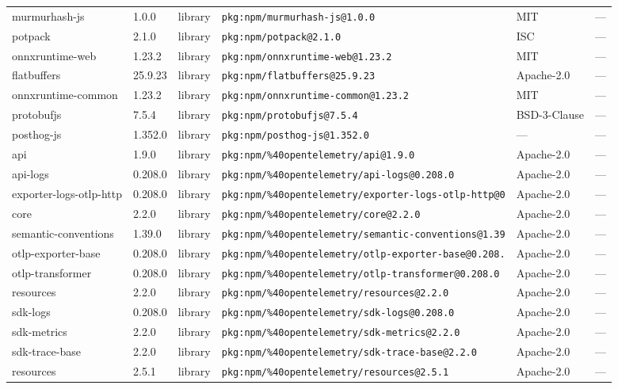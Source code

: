 \documentclass[11pt]{article}
\begin{document}
\begin{longtable}{|l|l|l|p{2.2cm}|l|p{4cm}|}
murmurhash-js & 1.0.0 & library & \texttt{pkg:npm/murmurhash-js@1.0.0} & MIT & — \\
potpack & 2.1.0 & library & \texttt{pkg:npm/potpack@2.1.0} & ISC & — \\
onnxruntime-web & 1.23.2 & library & \texttt{pkg:npm/onnxruntime-web@1.23.2} & MIT & — \\
flatbuffers & 25.9.23 & library & \texttt{pkg:npm/flatbuffers@25.9.23} & Apache-2.0 & — \\
onnxruntime-common & 1.23.2 & library & \texttt{pkg:npm/onnxruntime-common@1.23.2} & MIT & — \\
protobufjs & 7.5.4 & library & \texttt{pkg:npm/protobufjs@7.5.4} & BSD-3-Clause & — \\
posthog-js & 1.352.0 & library & \texttt{pkg:npm/posthog-js@1.352.0} & — & — \\
api & 1.9.0 & library & \texttt{pkg:npm/\%40opentelemetry/api@1.9.0} & Apache-2.0 & — \\
api-logs & 0.208.0 & library & \texttt{pkg:npm/\%40opentelemetry/api-logs@0.208.0} & Apache-2.0 & — \\
exporter-logs-otlp-http & 0.208.0 & library & \texttt{pkg:npm/\%40opentelemetry/exporter-logs-otlp-http@0} & Apache-2.0 & — \\
core & 2.2.0 & library & \texttt{pkg:npm/\%40opentelemetry/core@2.2.0} & Apache-2.0 & — \\
semantic-conventions & 1.39.0 & library & \texttt{pkg:npm/\%40opentelemetry/semantic-conventions@1.39} & Apache-2.0 & — \\
otlp-exporter-base & 0.208.0 & library & \texttt{pkg:npm/\%40opentelemetry/otlp-exporter-base@0.208.} & Apache-2.0 & — \\
otlp-transformer & 0.208.0 & library & \texttt{pkg:npm/\%40opentelemetry/otlp-transformer@0.208.0} & Apache-2.0 & — \\
resources & 2.2.0 & library & \texttt{pkg:npm/\%40opentelemetry/resources@2.2.0} & Apache-2.0 & — \\
sdk-logs & 0.208.0 & library & \texttt{pkg:npm/\%40opentelemetry/sdk-logs@0.208.0} & Apache-2.0 & — \\
sdk-metrics & 2.2.0 & library & \texttt{pkg:npm/\%40opentelemetry/sdk-metrics@2.2.0} & Apache-2.0 & — \\
sdk-trace-base & 2.2.0 & library & \texttt{pkg:npm/\%40opentelemetry/sdk-trace-base@2.2.0} & Apache-2.0 & — \\
resources & 2.5.1 & library & \texttt{pkg:npm/\%40opentelemetry/resources@2.5.1} & Apache-2.0 & — \\

\end{longtable}
\end{document}
